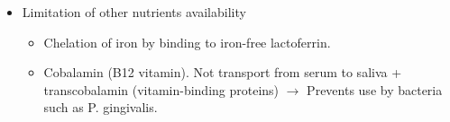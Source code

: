 \begin{tcolorbox}[breakable,
    title=Saliva,
    title filled=false,
    colback=blue!5!white,
    colframe=blue!75!black]
\begin{itemize}
\begin{itemize}
        \end{itemize}
        \item Limitation of other nutrients availability
        \begin{itemize}
            \item Chelation of iron by binding to iron-free lactoferrin. 
            \item Cobalamin (B12 vitamin). Not transport from serum to saliva + transcobalamin 
            (vitamin-binding proteins) $\rightarrow$ Prevents use by bacteria such as P. gingivalis. 
        \end{itemize}
    \end{itemize}
\end{tcolorbox}

